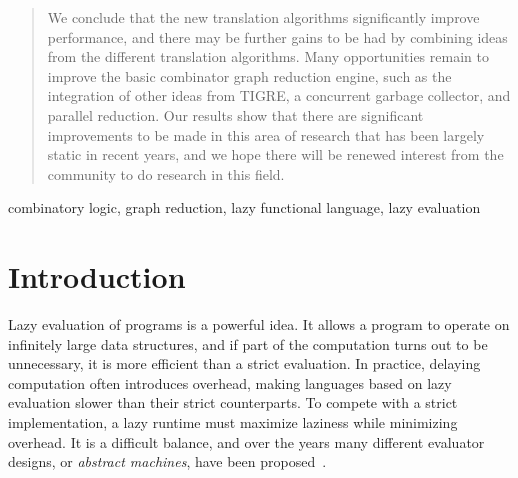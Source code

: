 \documentclass[conference]{IEEEtran}
\begin{document}
\begin{abstract}
    We conclude that the new translation algorithms significantly improve performance, and there may be further gains to be had by combining ideas from the different translation algorithms.
    Many opportunities remain to improve the basic combinator graph reduction engine, such as the integration of other ideas from TIGRE, a concurrent garbage collector, and parallel reduction.
    Our results show that there are significant improvements to be made in this area of research that has been largely static in recent years, and we hope there will be renewed interest from the community to do research in this field.
\end{abstract}

\begin{IEEEkeywords}
    combinatory logic, graph reduction, lazy functional language, lazy evaluation
\end{IEEEkeywords}

\section{Introduction}
Lazy evaluation of programs is a powerful idea.
It allows a program to operate on infinitely large data structures, and if part of the computation turns out to be unnecessary, it is more efficient than a strict evaluation.
In practice, delaying computation often introduces overhead, making languages based on lazy evaluation slower than their strict counterparts.
To compete with a strict implementation, a lazy runtime must maximize laziness while minimizing overhead.
It is a difficult balance, and over the years many different evaluator designs, or \textit{abstract machines}, have been proposed~\cite{turner_new_1979,kieburtz_g-machine_1985,fairbairn_tim_1987,burn_spineless_1988,koopman_fresh_1989,jones_implementing_nodate}.
\end{document}
